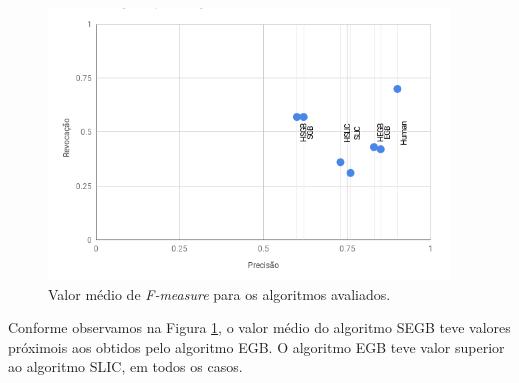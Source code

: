 \begin{document}

\begin{figure}[ht]
\centering
\includegraphics[width=0.95\textwidth]{graph_precision_recall.png}
\caption{Valor médio de \textit{F-measure} para os algoritmos avaliados.}
\label{fig:FMEASURE_AVG}
\end{figure}

Conforme observamos na Figura \ref{fig:FMEASURE_AVG}, o valor médio do algoritmo SEGB teve valores próximois aos obtidos pelo algoritmo EGB. O algoritmo EGB teve valor superior ao algoritmo SLIC, em todos os casos.
\end{document}
